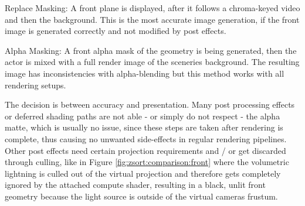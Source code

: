 \begin{my_list}
	\item Replace Masking: A front plane is displayed, after it follows a 
	chroma-keyed video and then the background. This is the most accurate image 
	generation, if the front image is generated correctly and not modified by 
	post effects.
	\item Alpha Masking: A front alpha mask of the geometry is being generated, 
	then the actor is mixed with a full render image of the sceneries 
	background. The resulting image has inconsistencies with alpha-blending but 
	this method works with all rendering setups. 
\end{my_list}

The decision is between accuracy and presentation. Many post processing effects 
or deferred shading paths are not able - or simply do not respect - the alpha 
matte, which is usually no issue, since these steps are taken after rendering 
is complete, thus causing no unwanted side-effects in regular rendering 
pipelines. Other post effects need certain projection requirements and / or get 
discarded through culling, like in Figure \ref{fig:zsort:comparison:front} 
where the volumetric lightning is culled out of the virtual projection and 
therefore gets completely ignored by the attached compute shader, resulting in 
a black, unlit front geometry because the light source is outside of the 
virtual cameras frustum. 

